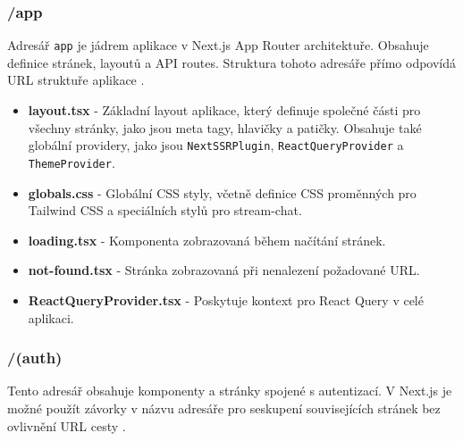 \documentclass[12pt]{article}
\begin{document}
\subsubsection{/app}

Adresář \texttt{app} je jádrem aplikace v Next.js App Router architektuře. Obsahuje definice stránek, layoutů a API routes. Struktura tohoto adresáře přímo odpovídá URL struktuře aplikace \citep{Vercel2023AppDir}.

\begin{itemize}
  \item \textbf{layout.tsx} - Základní layout aplikace, který definuje společné části pro všechny stránky, jako jsou meta tagy, hlavičky a patičky. Obsahuje také globální providery, jako jsou \texttt{NextSSRPlugin}, \texttt{ReactQueryProvider} a \texttt{ThemeProvider}.
  
  \item \textbf{globals.css} - Globální CSS styly, včetně definice CSS proměnných pro Tailwind CSS a speciálních stylů pro stream-chat.
  
  \item \textbf{loading.tsx} - Komponenta zobrazovaná během načítání stránek.
  
  \item \textbf{not-found.tsx} - Stránka zobrazovaná při nenalezení požadované URL.
  
  \item \textbf{ReactQueryProvider.tsx} - Poskytuje kontext pro React Query v celé aplikaci.
\end{itemize}

\subsubsection{/(auth)}

Tento adresář obsahuje komponenty a stránky spojené s autentizací. V Next.js je možné použít závorky v názvu adresáře pro seskupení souvisejících stránek bez ovlivnění URL cesty \citep{Vercel2023RouteGroups}.
\end{document}
